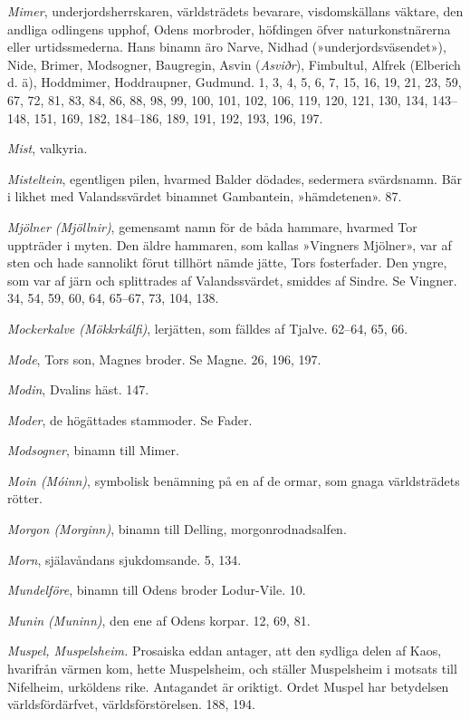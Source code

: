 \emph{Mimer}, underjordsherrskaren, världsträdets bevarare,
visdomskällans väktare, den andliga odlingens upphof, Odens morbroder,
höfdingen öfver naturkonstnärerna eller urtidssmederna. Hans binamn äro
Narve, Nidhad (»underjordsväsendet»), Nide, Brimer, Modsogner,
Baugregin, Asvin (\emph{Asviðr}), Fimbultul, Alfrek (Elberich d. ä),
Hoddmimer, Hoddraupner, Gudmund. 1, 3, 4, 5, 6, 7, 15, 16, 19, 21, 23,
59, 67, 72, 81, 83, 84, 86, 88, 98, 99, 100, 101, 102, 106, 119, 120,
121, 130, 134, 143--148, 151, 169, 182, 184--186, 189, 191, 192, 193,
196, 197.

\emph{Mist}, valkyria.

\protect\hypertarget{lb1625905.xhtmlux5cux23start232}{}{}\protect\hypertarget{lb1625905.xhtmlux5cux23start232-a}{}{}\protect\hypertarget{lb1625905.xhtmlux5cux23start232-b}{}{}\protect\hypertarget{lb1625905.xhtmlux5cux23start232-c}{}{}\protect\hypertarget{lb1625905.xhtmlux5cux23start232-d}{}{}

\emph{Misteltein}, egentligen pilen, hvarmed Balder dödades, sedermera
svärdsnamn. Bär i likhet med Valandssvärdet binamnet Gambantein,
»hämdetenen». 87.

\emph{Mjölner (Mjöllnir)}, gemensamt namn för de båda hammare, hvarmed
Tor uppträder i myten. Den äldre hammaren, som kallas »Vingners
Mjölner», var af sten och hade sannolikt förut tillhört nämde jätte,
Tors fosterfader. Den yngre, som var af järn och splittrades af
Valandssvärdet, smiddes af Sindre. Se Vingner. 34, 54, 59, 60, 64,
65--67, 73, 104, 138.

\emph{Mockerkalve (Mökkrkálfi)}, lerjätten, som fälldes af Tjalve.
62--64, 65, 66.

\emph{Mode}, Tors son, Magnes broder. Se Magne. 26, 196, 197.

\emph{Modin}, Dvalins häst. 147.

\emph{Moder}, de högättades stammoder. Se Fader.

\emph{Modsogner}, binamn till Mimer.

\emph{Moin (Móinn)}, symbolisk benämning på en af de ormar, som gnaga
världsträdets rötter.

\emph{Morgon (Morginn)}, binamn till Delling, morgonrodnadsalfen.

\emph{Morn}, själavåndans sjukdomsande. 5, 134.

\emph{Mundelföre}, binamn till Odens broder Lodur-Vile. 10.

\emph{Munin (Muninn)}, den ene af Odens korpar. 12, 69, 81.

\emph{Muspel, Muspelsheim.} Prosaiska eddan antager, att den sydliga
delen af Kaos, hvarifrån värmen kom, hette Muspelsheim, och ställer
Muspelsheim i motsats till Nifelheim, urköldens rike. Antagandet är
oriktigt. Ordet Muspel har betydelsen världsfördärfvet,
världsförstörelsen. 188, 194.

